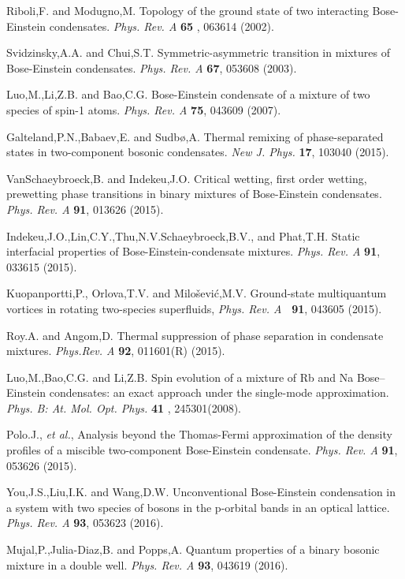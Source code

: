 \documentclass[single-column,showpacs,groupedaddress]{revtex4}
\begin{document}
\begin{thebibliography}{99}
 Riboli,F. and Modugno,M. Topology of the ground state of
two interacting Bose-Einstein condensates. \textit{Phys. Rev. A} \textbf{65}%
, 063614 (2002).

 Svidzinsky,A.A. and Chui,S.T. Symmetric-asymmetric
transition in mixtures of Bose-Einstein condensates. \textit{Phys. Rev. A}
\textbf{67}, 053608 (2003).

 Luo,M.,Li,Z.B. and Bao,C.G. Bose-Einstein condensate of a
mixture of two species of spin-1 atoms. \textit{Phys. Rev. A} \textbf{75},
043609 (2007).

 Galteland,P.N.,Babaev,E. and Sudb{\o },A. Thermal remixing
of phase-separated states in two-component bosonic condensates. \textit{New
J. Phys.} \textbf{17}, 103040 (2015).

 VanSchaeybroeck,B. and Indekeu,J.O. Critical wetting, first
order wetting, prewetting phase transitions in binary mixtures of
Bose-Einstein condensates. \textit{Phys. Rev. A} \textbf{91}, 013626 (2015).

 Indekeu,J.O.,Lin,C.Y.,Thu,N.V.Schaeybroeck,B.V., and
Phat,T.H. Static interfacial properties of Bose-Einstein-condensate
mixtures. \textit{Phys. Rev. A} \textbf{91}, 033615 (2015).

 Kuopanportti,P., Orlova,T.V. and Milo\v{s}evi\'{c},M.V.
Ground-state multiquantum vortices in rotating two-species superfluids,
\textit{Phys. Rev. A} \textbf{\ 91}, 043605 (2015).

 Roy.A. and Angom,D. Thermal suppression of phase separation
in condensate mixtures. \textit{Phys.Rev. A} \textbf{92}, 011601(R) (2015).

 Luo,M.,Bao,C.G. and Li,Z.B. Spin evolution of a mixture of
Rb and Na Bose--Einstein condensates: an exact approach under the
single-mode approximation. \textit{Phys. B: At. Mol. Opt. Phys.} \textbf{41}%
, 245301(2008).

 Polo.J., \textit{et al.}, Analysis beyond the Thomas-Fermi
approximation of the density profiles of a miscible two-component
Bose-Einstein condensate. \textit{Phys. Rev. A }\textbf{91}, 053626 (2015).

 You,J.S.,Liu,I.K. and Wang,D.W. Unconventional Bose-Einstein
condensation in a system with two species of bosons in the p-orbital bands
in an optical lattice. \textit{Phys. Rev. A} \textbf{93}, 053623 (2016).

 Mujal,P.,Julia-Diaz,B. and Popps,A. Quantum properties of a
binary bosonic mixture in a double well. \textit{Phys. Rev. A} \textbf{93},
043619 (2016).


\end{thebibliography}
\end{document}
